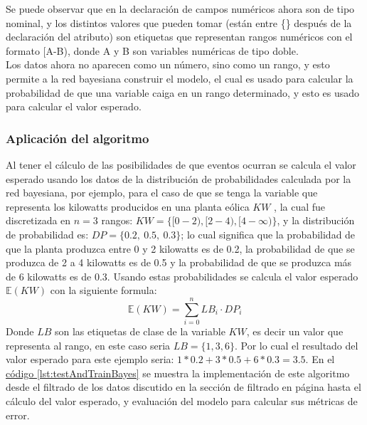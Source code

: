 Se puede observar que en la declaración de campos numéricos ahora son de tipo nominal, y los distintos valores que pueden tomar (están entre \{\} después de la declaración del atributo) son etiquetas que representan rangos numéricos con el formato [A-B), donde A y B son variables numéricas de tipo doble.\\
Los datos ahora no aparecen como un número, sino como un rango, y esto permite a la red bayesiana construir el modelo, el cual es usado para calcular la probabilidad de que una variable caiga en un rango determinado, y esto es usado para calcular el valor esperado.

\subsubsection{Aplicación del algoritmo}
Al tener el cálculo de las posibilidades de que eventos ocurran se calcula el valor esperado
usando los datos de la distribución de probabilidades calculada por la red bayesiana, por ejemplo, para el caso de que se tenga la  variable que representa los kilowatts producidos en una planta eólica $KW$ , la cual fue discretizada en $n=3$ rangos: 
$KW= \{[0-2), [2-4), [4-\infty)\}$, y la distribución de probabilidad es: 
$DP= \{0.2,~0.5,~0.3\} $; lo cual significa que la probabilidad de que la planta produzca entre 0 y 2 kilowatts es de 0.2, la probabilidad de que se produzca de 2 a 4 kilowatts es de 0.5 y la probabilidad de que se produzca más de 6 kilowatts es de 0.3. 
Usando estas probabilidades se calcula el valor esperado $\mathbb{E}(KW)$ con la siguiente formula: 
\begin{equation}  \label{eq:valorEsperado}
	\mathbb{E}(KW) = \sum_{i=0}^{n}{LB}_i \cdot {DP}_i 
\end{equation}
Donde $LB$ son las etiquetas de clase de la variable $KW$, es decir un valor que representa al rango, en este caso seria 
$LB=\{1, 3, 6\}$. 
Por lo cual el resultado del valor esperado para este ejemplo seria: $1*0.2 + 3*0.5 + 6*0.3= 3.5$.
En el \hyperref[lst:testAndTrainBayes]{ código \ref{lst:testAndTrainBayes}} se muestra la implementación de este algoritmo desde el filtrado de los datos discutido en la sección de filtrado en página \pageref{sec:filtrado} hasta el cálculo del valor esperado, y evaluación del modelo para calcular sus métricas de error.

